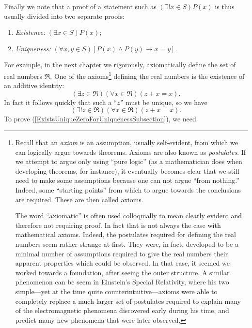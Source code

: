 Finally we note that a proof of a statement such as $(\exists !x\in S)P(x)$
is thus usually divided into two separate proofs: 
\begin{enumerate}[(1)]
\item{\it Existence:} $(\exists x\in S)P(x)$;
\item {\it Uniqueness:} $(\forall x,y\in S)[P(x)\wedge P(y)\longrightarrow 
                          x=y]$.
\end{enumerate}
For example, in the next chapter we rigorously, axiomatically define the 
set of real numbers $\Re$.  One of the axioms\footnote{
Recall that an {\it axiom} is an assumption,
usually self-evident, from which we can logically argue towards
theorems.  Axioms are also known as {\it postulates}.  
If we attempt to argue only using ``pure logic'' (as a mathematician
does when developing theorems, for instance), it eventually becomes
clear that we still need to make some assumptions
because one can not argue ``from nothing.''  
Indeed,  some ``starting points'' from which to argue
towards the conclusions are required.  These are then called axioms.

The word ``axiomatic'' is often used colloquially  to mean 
clearly evident and therefore not requiring proof.  In 
fact that is not always the case with mathematical axioms.  Indeed,
the postulates required for defining the real numbers seem rather
strange at first.  They were, in fact, developed to be a minimal
number of assumptions required to give the real numbers their apparent
properties which could be observed.  In that case, it seemed we
worked towards a foundation, after seeing the outer structure.
A similar phenomenon can be seem in Einstein's Special Relativity,
where his two simple---yet at the time quite counterintuitive---axioms
were able to completely replace a much larger set of postulates
required to explain many of the electromagnetic phenomena discovered
early during his time, and predict many new phenomena that were later
observed.   
}
defining the real numbers is the existence of an additive identity:
\begin{equation}
(\exists z\in\Re)(\forall x\in\Re)(z+x=x).\label{82930}
\end{equation}
In fact it follows quickly that such a ``$z$'' must be unique, so we have
\begin{equation}(\exists !z\in\Re)(\forall x\in\Re)(z+x=x).
\label{ExistsUniqueZeroForUniquenessSubsection}\end{equation}
To prove (\ref{ExistsUniqueZeroForUniquenessSubsection}), we need
